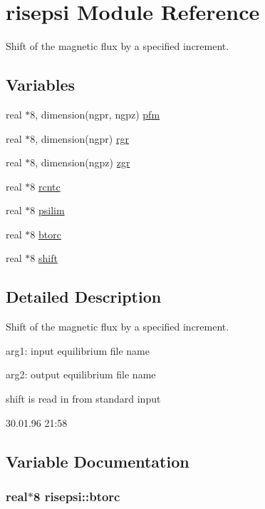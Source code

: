\hypertarget{namespacerisepsi}{
\section{risepsi Module Reference}
\label{namespacerisepsi}
}
Shift of the magnetic flux by a specified increment.  


\subsection*{Variables}
\begin{CompactItemize}
\item 
real $\ast$8, dimension(ngpr, ngpz) \hyperlink{namespacerisepsi_abc0a1f2c2e97d9f2250a5ceb4116208}{pfm}
\item 
real $\ast$8, dimension(ngpr) \hyperlink{namespacerisepsi_2c87a7df84e82267048de20d41dc8f2c}{rgr}
\item 
real $\ast$8, dimension(ngpz) \hyperlink{namespacerisepsi_0634f432b4995d66062308d5613c7fc5}{zgr}
\item 
real $\ast$8 \hyperlink{namespacerisepsi_efd32323d70597b7c7826a19774b96c7}{rcntc}
\item 
real $\ast$8 \hyperlink{namespacerisepsi_8284737207616a8fb7b5c049b96f2892}{psilim}
\item 
real $\ast$8 \hyperlink{namespacerisepsi_5df6cf4ba10c7c733c5390d311df12e1}{btorc}
\item 
real $\ast$8 \hyperlink{namespacerisepsi_436baf8e4903206b7958c1ce68f457e1}{shift}
\end{CompactItemize}


\subsection{Detailed Description}
Shift of the magnetic flux by a specified increment. 

arg1: input equilibrium file name

arg2: output equilibrium file name

shift is read in from standard input

\begin{Desc}
\item[Version:]30.01.96 21:58 \end{Desc}


\subsection{Variable Documentation}
\hypertarget{namespacerisepsi_5df6cf4ba10c7c733c5390d311df12e1}{
\subsubsection[btorc]{\setlength{\rightskip}{0pt plus 5cm}real$\ast$8 {\bf risepsi::btorc}}}
\label{namespacerisepsi_5df6cf4ba10c7c733c5390d311df12e1}




